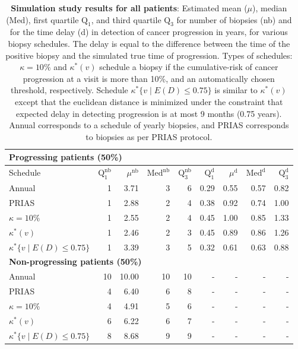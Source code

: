 \begin{table}[!htb]
\caption{\textbf{Simulation study results for all patients}: Estimated mean ($\mu$), median (Med), first quartile $\mbox{Q}_1$, and third quartile $\mbox{Q}_3$ for number of biopsies (nb) and for the time delay (d) in detection of cancer progression in years, for various biopsy schedules. The delay is equal to the difference between the time of the positive biopsy and the simulated true time of progression. Types of schedules: ${\kappa=10\%}$ and $\kappa^*(v)$ schedule a biopsy if the cumulative-risk of cancer progression at a visit is more than 10\%, and an automatically chosen threshold, respectively. Schedule ${\kappa^*\{v \mid E(D)\leq 0.75\}}$ is similar to $\kappa^*(v)$ except that the euclidean distance is minimized under the constraint that expected delay in detecting progression is at most 9 months (0.75 years). Annual corresponds to a schedule of yearly biopsies, and PRIAS corresponds to biopsies as per PRIAS protocol.}
\label{table:sim_study_all}
\begin{tabular}{l|rrrr|rrrr}
\hline
\hline
\multicolumn{9}{l}{\textbf{Progressing patients (50\%)}}\\
\hline
Schedule & $\mbox{Q}_1^{\mbox{nb}}$ & $\mu^{\mbox{nb}}$ & $\mbox{Med}^{\mbox{nb}}$ & $\mbox{Q}_3^{\mbox{nb}}$ & $\mbox{Q}_1^{\mbox{d}}$ & $\mu^{\mbox{d}}$ & $\mbox{Med}^{\mbox{d}}$  & $\mbox{Q}_3^{\mbox{d}}$ \\
\hline
Annual        & 1  & 3.71 & 3  & 6  & 0.29 & 0.55 & 0.57 & 0.82\\
PRIAS         & 1  & 2.88 & 2  & 4  & 0.38 & 0.92 & 0.74 & 1.00\\
$\kappa=10\%$ & 1  & 2.55 & 2  & 4  & 0.45 & 1.00 & 0.85 & 1.33\\
$\kappa^*(v)$ & 1  & 2.46 & 2  & 3  & 0.45 & 0.89 & 0.86 & 1.26\\
$\kappa^*\{v \mid E(D)\leq 0.75\}$ & 1  & 3.39 & 3  & 5  & 0.32 & 0.61 & 0.63 & 0.88\\
\hline
\multicolumn{9}{l}{\textbf{Non-progressing patients (50\%)}}\\
\hline
Annual         & 10 & 10.00   & 10 & 10 & - & - & - & -\\
PRIAS          & 4  & 6.40 & 6  & 8  & - & - & - & -\\
$\kappa=10\%$  & 4  & 4.91 & 5  & 6  & - & - & - & - \\
$\kappa^*(v)$  & 6  & 6.22 & 6  & 7  & - & - & - & -\\
$\kappa^*\{v \mid E(D)\leq 0.75\}$ & 8 & 8.68 & 9  & 9  & - & - & - & -\\
\hline
\end{tabular}
\end{table}